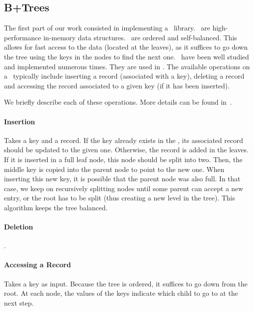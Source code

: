 \subsection{B+Trees}
The first part of our work consisted in implementing a \btrees\ library.
\btrees\ are high-performance in-memory data structures. \btrees\ are ordered and self-balanced.
This allows for fast access to the data (located at the leaves), as it suffices to go down the tree using the keys in the nodes to find the next one.
\btrees\ have been well studied  and implemented numerous times. They are used in .
The available operations on a \btree\ typically include inserting a record (associated with a key), deleting a record and accessing the record associated to a given key (if it has been inserted).

We briefly describe each of these operations. More details can be found in~\cite{dbms}.
\paragraph{Insertion} Takes a key and a record.
If the key already exists in the \btree, its associated record should be updated to the given one. Otherwise, the record is added in the leaves.
If it is inserted in a full leaf node, this node should be split into two. Then, the middle key is copied into the parent node to point to the new one.
When inserting this new key, it is possible that the parent node was also full.
In that case, we keep on recursively splitting nodes until some parent can accept a new entry, or the root has to be split (thus creating a new level in the tree).
This algorithm keeps the tree balanced.
 
\paragraph{Deletion} . 
\paragraph{Accessing a Record} Takes a key as input. Because the tree is ordered, it suffices to go down from the root.
At each node, the values of the keys indicate which child to go to at the next step.  

